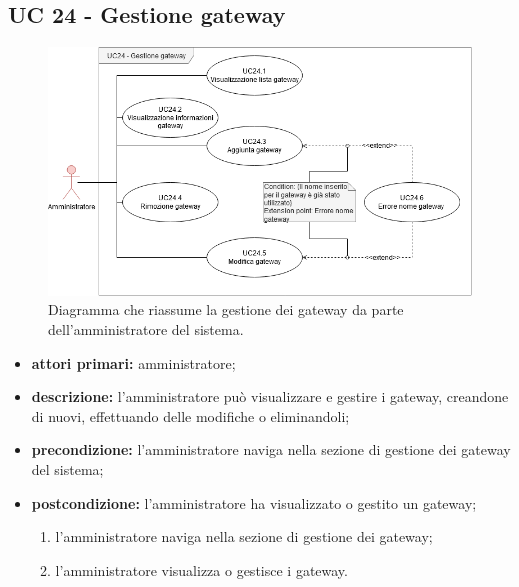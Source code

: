 
		\subsection{UC 24 - Gestione gateway}

		\begin{figure}[H]
			\centering
			\includegraphics[scale=0.60]{res/images/uc24}
			\caption{Diagramma che riassume la gestione dei gateway da parte dell'amministratore del sistema.}
		\end{figure}

		\begin{itemize}
			\item \textbf{attori primari:} amministratore;
			\item \textbf{descrizione:} l'amministratore può visualizzare e gestire i gateway, creandone di nuovi, effettuando delle modifiche o eliminandoli;
			\item \textbf{precondizione:} l'amministratore naviga nella sezione di gestione dei gateway del sistema;
			\item \textbf{postcondizione:} l'amministratore ha visualizzato o gestito un gateway;
			\begin{enumerate}
				\item{l'amministratore naviga nella sezione di gestione dei gateway;}
				\item{l'amministratore visualizza o gestisce i gateway.}
			\end{enumerate} 
		\end{itemize}

